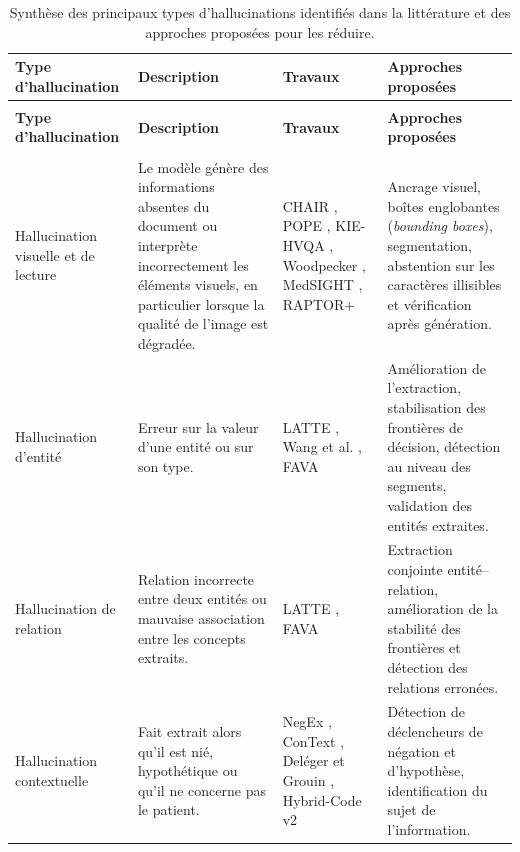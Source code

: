 {\footnotesize
\renewcommand{\arraystretch}{1.35}
\begin{longtable}{|>{\raggedright\arraybackslash}p{2.6cm}|>{\raggedright\arraybackslash}p{4.2cm}|>{\raggedright\arraybackslash}p{3.4cm}|>{\raggedright\arraybackslash}p{4.0cm}|}
\caption{Synthèse des principaux types d'hallucinations identifiés dans la littérature et des approches proposées pour les réduire.}
\label{tab:hallucinations}\\
\hline
\textbf{Type d'hallucination} & \textbf{Description} & \textbf{Travaux} & \textbf{Approches proposées} \\
\hline
\endfirsthead
\multicolumn{4}{l}{\textit{Tableau~\ref{tab:hallucinations} (suite)}}\\
\hline
\textbf{Type d'hallucination} & \textbf{Description} & \textbf{Travaux} & \textbf{Approches proposées} \\
\hline
\endhead
\hline
\multicolumn{4}{r}{\textit{Suite à la page suivante}}\\
\endfoot
\hline
\endlastfoot

Hallucination visuelle et de lecture &
Le modèle génère des informations absentes du document ou interprète incorrectement les éléments visuels, en particulier lorsque la qualité de l'image est dégradée. &
CHAIR \cite{rohrbach2018chair}, POPE \cite{li2023pope}, KIE-HVQA \cite{he2025seeing}, Woodpecker \cite{woodpecker2023}, MedSIGHT \cite{chang2026medsight}, RAPTOR+ \cite{raptorplus2026} &
Ancrage visuel, boîtes englobantes (\textit{bounding boxes}), segmentation, abstention sur les caractères illisibles et vérification après génération.\\
\hline

Hallucination d'entité &
Erreur sur la valeur d'une entité ou sur son type. &
LATTE \cite{zhang2026latte}, Wang et al. \cite{wang2024feature}, FAVA \cite{mishra2024fava} &
Amélioration de l'extraction, stabilisation des frontières de décision, détection au niveau des segments, validation des entités extraites.\\
\hline

Hallucination de relation &
Relation incorrecte entre deux entités ou mauvaise association entre les concepts extraits. &
LATTE \cite{zhang2026latte}, FAVA \cite{mishra2024fava} &
Extraction conjointe entité--relation, amélioration de la stabilité des frontières et détection des relations erronées.\\
\hline

Hallucination contextuelle &
Fait extrait alors qu'il est nié, hypothétique ou qu'il ne concerne pas le patient. &
NegEx \cite{chapman2001negex}, ConText \cite{harkema2009context}, Deléger et Grouin \cite{deleger2012negation}, Hybrid-Code v2 \cite{hybrid2512v2} &
Détection de déclencheurs de négation et d'hypothèse, identification du sujet de l'information.\\
\hline


\end{longtable}}
